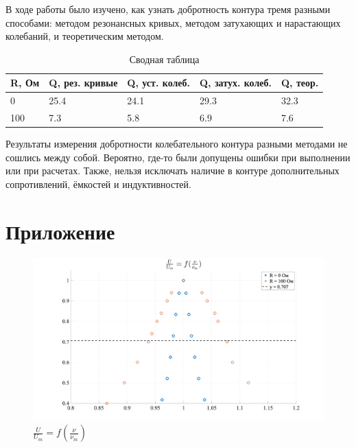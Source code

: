 \documentclass[a4paper, 12pt]{article}
\begin{document}
В ходе работы было изучено, как узнать добротность контура тремя разными способами: методом резонансных кривых,
методом затухающих и нарастающих колебаний, и теоретическим методом.

\begin{table}[h]
	\centering
	\begin{tabular}{|l|l|l|l|l|}
	\hline
	R, Ом & Q, рез. кривые & Q, уст. колеб. & Q, затух. колеб. & Q, теор. \\ \hline
	0     & 25.4          & 24.1          & 29.3           & 32.3    \\ \hline
	100   & 7.3           & 5.8           & 6.9             & 7.6     \\ \hline
	\end{tabular}
	\caption{Сводная таблица}
	\label{tab:itogi}
\end{table}
Результаты измерения добротности колебательного контура разными методами не сошлись между собой. Вероятно, 
где-то были допущены ошибки при выполнении или при расчетах. Также, нельзя исключать наличие в контуре дополнительных
сопротивлений, ёмкостей и индуктивностей.

\section{Приложение}

\begin{figure}[H]
    \centering
    \includegraphics[width=1\textwidth]{plot}
    \caption{$\frac{U}{U_m} = f(\frac{\nu}{\nu_m})$}
    \label{fig:graph}
\end{figure}
\end{document}
